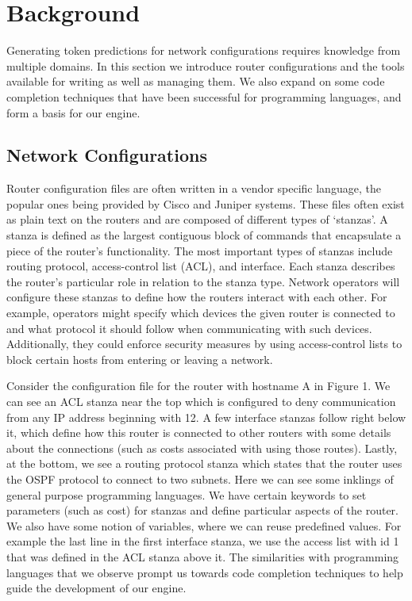 \section{Background}

Generating token predictions for network configurations requires knowledge from multiple domains. In this section we introduce router configurations and the tools available for writing as well as managing them. We also expand on some code completion techniques that have been successful for programming languages, and form a basis for our engine.

\subsection{Network Configurations} 

Router configuration files are often written in a vendor specific language, the popular ones being provided by Cisco and Juniper systems. These files often exist as plain text on the routers and are composed of different types of `stanzas'. A stanza is defined as the largest contiguous block of commands that encapsulate a piece of the router's functionality. The most important types of stanzas include routing protocol, access-control list (ACL), and interface. Each stanza describes the router's particular role in relation to the stanza type. Network operators will configure these stanzas to define how the routers interact with each other. For example, operators might specify which devices the given router is connected to and what protocol it should follow when communicating with such devices. Additionally, they could enforce security measures by using access-control lists to block certain hosts from entering or leaving a network. 

 Consider the configuration file for the router with hostname A in Figure 1. We can see an ACL stanza near the top which is configured to deny communication from any IP address beginning with 12. A few interface stanzas follow right below it, which define how this router is connected to other routers with some details about the connections (such as costs associated with using those routes). Lastly, at the bottom, we see a routing protocol stanza which states that the router uses the OSPF protocol to connect to two subnets. Here we can see some inklings of general purpose programming languages. We have certain keywords to set parameters (such as cost) for stanzas and define particular aspects of the router. We also have some notion of variables, where we can reuse predefined values. For example the last line in the first interface stanza, we use the access list with id 1 that was defined in the ACL stanza above it. The similarities with programming languages that we observe prompt us towards code completion techniques to help guide the development of our engine.

